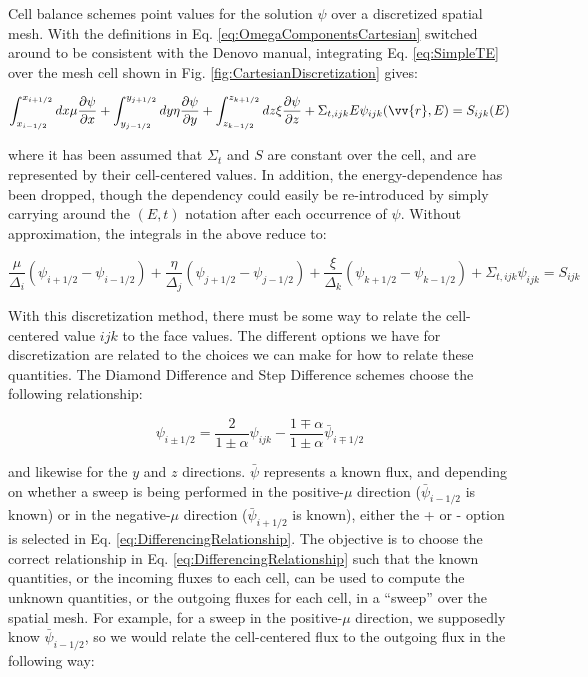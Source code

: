 \documentclass[10pt]{article}
\newcounter{subsubsubsection}[subsubsection]
\begin{document}
\begin{flushleft}
\clearpage





Cell balance schemes point values for the solution \(\psi\) over a discretized spatial mesh. With the definitions in Eq. \eqref{eq:OmegaComponentsCartesian} switched around to be consistent with the Denovo manual, integrating Eq. \eqref{eq:SimpleTE} over the mesh cell shown in Fig. \ref{fig:CartesianDiscretization} gives:

\begin{equation}
\int_{x_{i-1/2}}^{x_{i+1/2}}dx\mu \frac{\partial \psi}{\partial x}+\int_{y_{j-1/2}}^{y_{j+1/2}}dy\eta \frac{\partial \psi}{\partial y}+\int_{z_{k-1/2}}^{z_{k+1/2}}dz\xi \frac{\partial \psi}{\partial z}+\Sigma_{t,ijk}{E}\psi_{ijk}(\vv{r},E)=S_{ijk}(E)
\end{equation}

where it has been assumed that \(\Sigma_t\) and \(S\) are constant over the cell, and are represented by their cell-centered values. In addition, the energy-dependence has been dropped, though the dependency could easily be re-introduced by simply carrying around the \((E, t)\) notation after each occurrence of \(\psi\). Without approximation, the integrals in the above reduce to:

\begin{equation}
\label{eq:DiscretizedCartesianTE}
\frac{\mu}{\Delta_i}(\psi_{i+1/2}-\psi_{i-1/2})+\frac{\eta}{\Delta_j}(\psi_{j+1/2}-\psi_{j-1/2})+\frac{\xi}{\Delta_k}(\psi_{k+1/2}-\psi_{k-1/2})+\Sigma_{t,ijk}\psi_{ijk}=S_{ijk}
\end{equation}

With this discretization method, there must be some way to relate the cell-centered value \(ijk\) to the face values. The different options we have for discretization are related to the choices we can make for how to relate these quantities. The Diamond Difference and Step Difference schemes choose the following relationship:

\begin{equation}
\label{eq:DifferencingRelationship}
\psi_{i\pm1/2}=\frac{2}{1\pm\alpha}\psi_{ijk}-\frac{1\mp\alpha}{1\pm\alpha}\bar{\psi}_{i\mp1/2}
\end{equation}

and likewise for the \(y\) and \(z\) directions. \(\bar{\psi}\) represents a known flux, and depending on whether a sweep is being performed in the positive-\(\mu\) direction (\(\bar{\psi}_{i-1/2}\) is known) or in the negative-\(\mu\) direction (\(\bar{\psi}_{i+1/2}\) is known), either the + or - option is selected in Eq. \eqref{eq:DifferencingRelationship}. The objective is to choose the correct relationship in Eq. \eqref{eq:DifferencingRelationship} such that the known quantities, or the incoming fluxes to each cell, can be used to compute the unknown quantities, or the outgoing fluxes for each cell, in a ``sweep'' over the spatial mesh. For example, for a sweep in the positive-\(\mu\) direction, we supposedly know \(\bar{\psi}_{i-1/2}\), so we would relate the cell-centered flux to the outgoing flux in the following way:


\end{flushleft}
\end{document}
